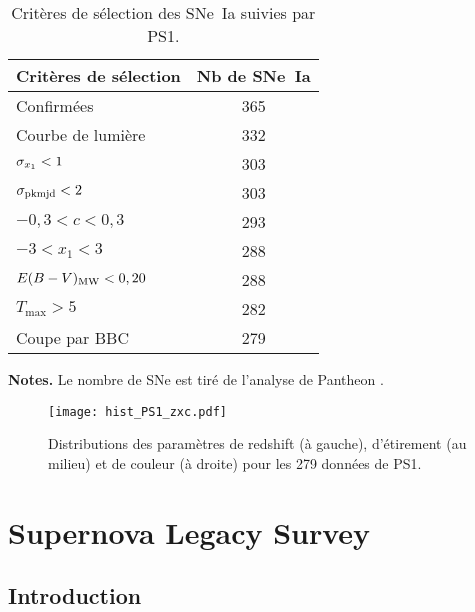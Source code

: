 \documentclass[../main/main.tex]{subfiles}
\begin{document}
\begin{table}[]
    \centering
    \begin{threeparttable}
        \caption{Critères de sélection des SNe~Ia suivies par PS1.}
        \label{tab:ps1cuts}
        \begin{tabular}{lc}
            \toprule
            Critères de sélection     & Nb de SNe~Ia \\
            \midrule
            Confirmées                & 365 \\
            Courbe de lumière         & 332 \\
            $\sigma_{x_1} < 1$            & 303 \\
            $\sigma_{\rm pkmjd} < 2$      & 303 \\
            $-0,3 < c < 0,3$          & 293 \\
            $-3 < x_1 < 3$            & 288 \\
            $E(B-V)_{\rm MW} < 0,20 $ & 288 \\
            $T_{\max} > 5$            & 282 \\
            \midrule
            Coupe par BBC             & 279 \\
            \bottomrule
        \end{tabular}
        \begin{tablenotes}[flushleft]
        \item\small \textbf{\hspace{-3,2pt}Notes.} Le nombre de SNe est tiré de
            l'analyse de Pantheon \citep{scolnic2018}.
        \end{tablenotes}
    \end{threeparttable}
\end{table}

\begin{figure}[ht]
    \centering
    \texttt{[image: hist\_PS1\_zxc.pdf]}
    \caption[Distributions des paramètres de redshift, étirement et couleur de
    PS1]{Distributions des paramètres de redshift (à gauche), d'étirement (au
    milieu) et de couleur (à droite) pour les 279 données de PS1.}
    \label{fig:ps1hist}
\end{figure}

\section{Supernova Legacy Survey}\label{sec:snls}
\subsection{Introduction}\label{ssec:snlsintro}
\end{document}
